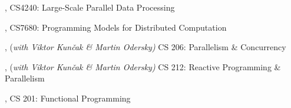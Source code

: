\documentclass[9pt]{article}
\begin{document}
\bigskip

\medskip
{}

,  
\newline\noindent CS4240: Large-Scale Parallel Data Processing 
\bigskip

, 
\newline\noindent CS7680: Programming Models for Distributed Computation 
\bigskip

, {(\em with Viktor Kun\v cak \& Martin Odersky)} 
\newline\noindent CS 206: Parallelism \& Concurrency 
\bigskip

, {(\em with Viktor Kun\v cak \& Martin Odersky)} 
\newline\noindent CS 212: Reactive Programming \& Parallelism 
\bigskip

, 
\newline\noindent CS 201: Functional Programming 
\bigskip

\end{document}
